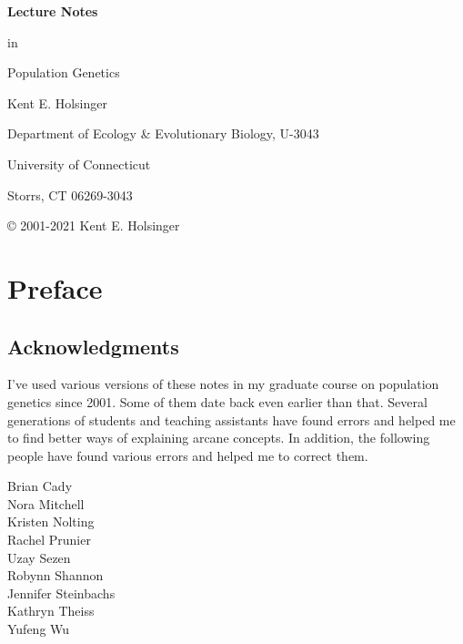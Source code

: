 \documentclass[12pt,titlepage,openright]{book}
\begin{document}
\begin{titlepage}

{\Large\bf \noindent Lecture Notes

\noindent in

\noindent Population Genetics

}

\vfill

{\noindent Kent E. Holsinger

\noindent Department of Ecology \& Evolutionary Biology, U-3043

\noindent University of Connecticut

\noindent Storrs, CT  06269-3043}

\vfill

\end{titlepage}


{\small\noindent \copyright{} 2001-2021 Kent E. Holsinger

\ccLicense}

\tableofcontents

\chapter*{Preface}

\section*{Acknowledgments}

I've used various versions of these notes in my graduate course on
population genetics
since 2001. Some of them date back even earlier than that. Several
generations of students and teaching assistants have found errors and
helped me to find better ways of explaining arcane concepts. In
addition, the following people have found various errors and helped me
to correct them.

\begin{multicols}{2}
\noindent Brian Cady \\
Nora Mitchell \\
Kristen Nolting \\
Rachel Prunier \\
Uzay Sezen \\
Robynn Shannon \\
Jennifer Steinbachs \\
Kathryn Theiss \\
Yufeng Wu \\
\end{multicols}
\end{document}

